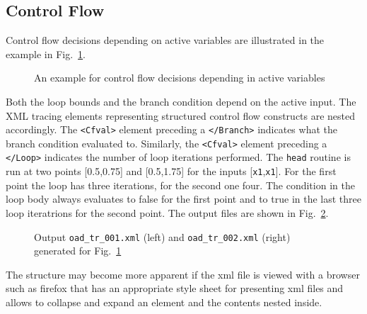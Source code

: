 \documentclass{article}
\newcommand{\reffig}[1]{{Fig.~\ref{#1}}}
\begin{document}
\subsection{Control Flow}
Control flow decisions depending on active variables are illustrated in the example in 
\reffig{fig:ControlFlow}.
\begin{figure}

\caption{An example for control flow decisions depending in active variables}\label{fig:ControlFlow} 
\end{figure} 
Both the loop bounds and the branch condition depend on the active input.  
The XML tracing elements representing structured control flow constructs are nested accordingly. 
The \lstinline{<Cfval>} element preceding a \lstinline{</Branch>} indicates what the branch 
condition evaluated to. Similarly, the \lstinline{<Cfval>} element preceding a \lstinline{</Loop>} 
indicates the number of loop iterations performed.       
The \lstinline{head} routine 
is run at two  points [0.5,0.75] and [0.5,1.75] for the inputs [\lstinline{x1},\lstinline{x1}].
For the first point the loop has three iterations, for the second one four. The condition in the loop body always evaluates to false for the first point and to true in the last three loop iteratrions for the second point. The output files are shown in \reffig{fig:ControlFlowOutput}. 
\begin{figure}
\begin{minipage}{.5\textwidth}

\end{minipage}
\begin{minipage}{.5\textwidth}

\end{minipage}
\caption{Output \lstinline{oad_tr_001.xml} (left) 
and \lstinline{oad_tr_002.xml} (right) 
generated for \reffig{fig:ControlFlow}}\label{fig:ControlFlowOutput}
\end{figure}
The structure may become more apparent if the xml file is viewed  
with a browser such as firefox that has an appropriate style sheet for presenting xml files 
and allows to collapse and expand an element and the contents nested inside. 
\end{document}
